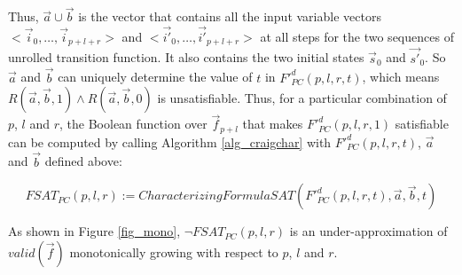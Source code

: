 Thus,
$\vec{a}\cup\vec{b}$ is the vector that contains all the input variable vectors $<\vec{i}_0,\dots,\vec{i}_{p+l+r}>$ and $<\vec{i'}_0,\dots,\vec{i'}_{p+l+r}>$
at all steps for the two sequences of unrolled transition function.
It also contains the two initial states $\vec{s}_0$ and $\vec{s'}_0$.
So $\vec{a}$ and $\vec{b}$ can uniquely determine the value of $t$ in $F'^d_{PC}(p,l,r,t)$,
which means $R(\vec{a},\vec{b},1)\wedge R(\vec{a},\vec{b},0)$ is unsatisfiable.
Thus,
for a particular combination of $p$, $l$ and $r$,
the Boolean function over $\vec{f}_{p+l}$ that makes $F'^d_{PC}(p,l,r,1)$ satisfiable can be computed
by calling Algorithm \ref{alg_craigchar} with $F'^d_{PC}(p,l,r,t)$, $\vec{a}$ and $\vec{b}$ defined above:

\begin{equation}\label{fsat_pc}
FSAT_{PC}(p,l,r):=CharacterizingFormulaSAT(F'^d_{PC}(p,l,r,t),\vec{a},\vec{b},t)
\end{equation}

%
As shown in Figure \ref{fig_mono},
$\neg FSAT_{PC}(p,l,r)$ is an under-approximation of $valid(\vec{f})$ monotonically growing with respect to
$p$, $l$ and $r$.




